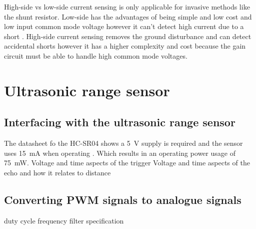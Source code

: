 High-side vs low-side current sensing is only applicable for invasive methods like the shunt resistor. Low-side has the advantages of being simple and low cost and low input common mode voltage however it can't detect high current due to a short \cite{EG_CurSens}. High-side current sensing removes the ground disturbance and can detect accidental shorts however it has a higher complexity and cost because the gain circuit must be able to handle high common mode voltages\cite{EG_CurSens}.  

\clearpage
\section{Ultrasonic range sensor}
\subsection{Interfacing with the ultrasonic range sensor}
The datasheet fo the HC-SR04 shows a \SI{5}{\volt} supply is required and the sensor uses \SI{15}{\milli\ampere} when operating \cite{Design_SonicSens}. Which results in an operating power usage of \SI{75}{\milli\watt}.
Voltage and time aspects of the trigger
Voltage and time aspects of the echo and how it relates to distance

\subsection{Converting PWM signals to analogue signals}
duty cycle
frequency
filter specification